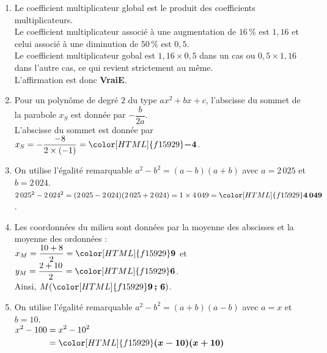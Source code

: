 \documentclass[a4paper,11pt,landscape,exos]{nsi} %
\begin{document}
\begin{multicols}{2}
\begin{enumerate}[]
\item Le coefficient multiplicateur global est le produit des coefficients multiplicateurs.\\
    Le coefficient multiplicateur associé à une augmentation de $16\,\%$ est $1{,}16$ et celui associé à une diminution de 
    $50\,\%$ est $0{,}5$.\\ 
    Le coefficient multiplicateur gobal est  $1{,}16\times 0{,}5$ dans un cas ou $0{,}5\times 1{,}16$ dans l'autre cas, ce qui revient strictement au même. 
    \\
  L'affirmation est donc  {\bfseries \color[HTML]{f15929}VraiE}.
\item Pour un polynôme de degré $2$ du type $ax^2+bx+c$, l'abscisse du sommet 
    de la parabole $x_S$ est donnée par $-\dfrac{b}{2a}$.\\
     L'abscisse du sommet est donnée  par $x_S=-\dfrac{-8}{2\times (-1)}={\color[HTML]{f15929}\boldsymbol{-4}}$.
     
   


 \item On utilise l'égalité remarquable $a^2-b^2=(a-b)(a+b)$ avec $a=2\,025$ et $b=2\,024$.\\
        $2\,025^2-2\,024^2=(2\,025-2\,024)(2\,025+2\,024)=1\times 4\,049={\color[HTML]{f15929}\boldsymbol{4\,049}}$.
             

\item Les coordonnées du milieu sont données par la moyenne des abscisses et la moyenne des ordonnées : \\
      $x_M=\dfrac{10+8}{2}={\color[HTML]{f15929}\boldsymbol{9}}$ et $y_M=\dfrac{2+10}{2}={\color[HTML]{f15929}\boldsymbol{6}}$.\\
      Ainsi,  $M({\color[HTML]{f15929}\boldsymbol{9\,;\,6}})$.
\item On utilise l'égalité remarquable $a^2-b^2=(a+b)(a-b)$ avec $a=x$ et $b=10$.\\
      $\begin{aligned}x^2-100&=x^2-10^2\\
      &={\color[HTML]{f15929}\boldsymbol{(x-10)(x+10)}}\end{aligned}$
      \vfill\null
      \columnbreak
\end{enumerate}
$\quad$\\
\end{multicols}
\end{document}
